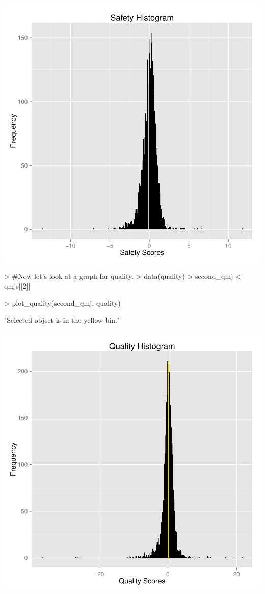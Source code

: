 \documentclass[titlepage]{article}
\begin{document}
\includegraphics{paper-006}

\begin{Schunk}
\begin{Sinput}
> #Now let's look at a graph for quality.
> data(quality)
> second_qmj <- qmjs[[2]]
\end{Sinput}
\end{Schunk}
\begin{Schunk}
\begin{Sinput}
> plot_quality(second_qmj, quality)
\end{Sinput}
\begin{Soutput}
[1] "Selected object is in the yellow bin."
\end{Soutput}
\end{Schunk}
\includegraphics{paper-008}
\end{document}
